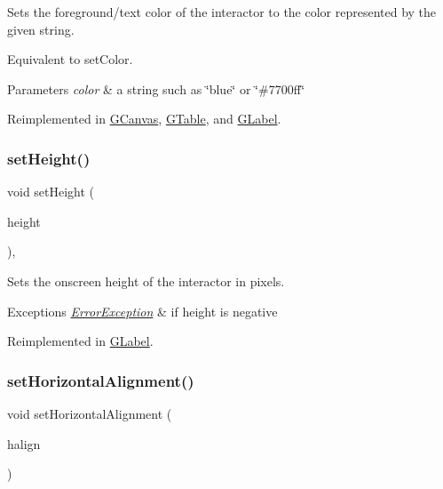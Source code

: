 Sets the foreground/text color of the interactor to the color represented by the given string. 

Equivalent to set\+Color. 
\begin{DoxyParams}{Parameters}
{\em color} & a string such as \char`\"{}blue\char`\"{} or \char`\"{}\#7700ff\char`\"{} \\
\hline
\end{DoxyParams}


Reimplemented in \mbox{\hyperlink{classGCanvas_a088e04dfc56273df4cedab2b11b970f5}{G\+Canvas}}, \mbox{\hyperlink{classGTable_a088e04dfc56273df4cedab2b11b970f5}{G\+Table}}, and \mbox{\hyperlink{classGLabel_a088e04dfc56273df4cedab2b11b970f5}{G\+Label}}.

\mbox{\label{classGInteractor_a9e280bfc4544dfaf8e4376c4e1a74357}} 
\subsubsection{\texorpdfstring{set\+Height()}{setHeight()}}
{\footnotesize\ttfamily void set\+Height (\begin{DoxyParamCaption}\item[{double}]{height }\end{DoxyParamCaption})\hspace{0.3cm}{\ttfamily [virtual]}, {\ttfamily [inherited]}}



Sets the onscreen height of the interactor in pixels. 


\begin{DoxyExceptions}{Exceptions}
{\em \mbox{\hyperlink{classErrorException}{Error\+Exception}}} & if height is negative \\
\hline
\end{DoxyExceptions}


Reimplemented in \mbox{\hyperlink{classGLabel_a8a1f6693796b536d1ace7ce0ff66afee}{G\+Label}}.

\mbox{\label{classGContainer_a901653aacb9991ee9a8b70d4a932f0c9}} 
\subsubsection{\texorpdfstring{set\+Horizontal\+Alignment()}{setHorizontalAlignment()}}
{\footnotesize\ttfamily void set\+Horizontal\+Alignment (\begin{DoxyParamCaption}\item[{Horizontal\+Alignment}]{halign }\end{DoxyParamCaption})\hspace{0.3cm}{\ttfamily [virtual]}}



